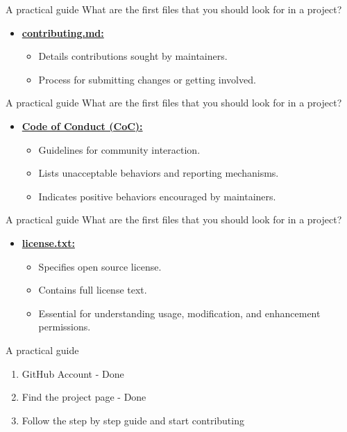 \begin{frame}{A practical guide}
    What are the first files that you should look for in a project?
    \begin{itemize}
    \item \href{https://github.com/firstcontributions/first-contributions/blob/main/Contributors.md}{\textbf{contributing.md:}}
        \begin{itemize}
            \item Details contributions sought by maintainers.
            \item Process for submitting changes or getting involved.
        \end{itemize}
    \end{itemize}

\end{frame}

\begin{frame}{A practical guide}
    What are the first files that you should look for in a project?
    \begin{itemize}
        \item \href{https://github.com/firstcontributions/first-contributions/blob/main/CODE_OF_CONDUCT.md}{\textbf{Code of Conduct (CoC):}}
        \begin{itemize}
            \item Guidelines for community interaction.
            \item Lists unacceptable behaviors and reporting mechanisms.
            \item Indicates positive behaviors encouraged by maintainers.
        \end{itemize}
    \end{itemize}

\end{frame}

\begin{frame}{A practical guide}
    What are the first files that you should look for in a project?
    \begin{itemize}
            \item 
            \href{https://github.com/firstcontributions/first-contributions/blob/main/LICENSE}{\textbf{license.txt:}}
        \begin{itemize}
            \item Specifies open source license.
            \item Contains full license text.
            \item Essential for understanding usage, modification, and enhancement permissions.
        \end{itemize}
    \end{itemize}

\end{frame}

\begin{frame}{A practical guide}
    \begin{enumerate}[<+->]
        \item GitHub Account - Done
        \item Find the project page - Done
        \item Follow the step by step guide and start contributing
    \end{enumerate}
\end{frame}
